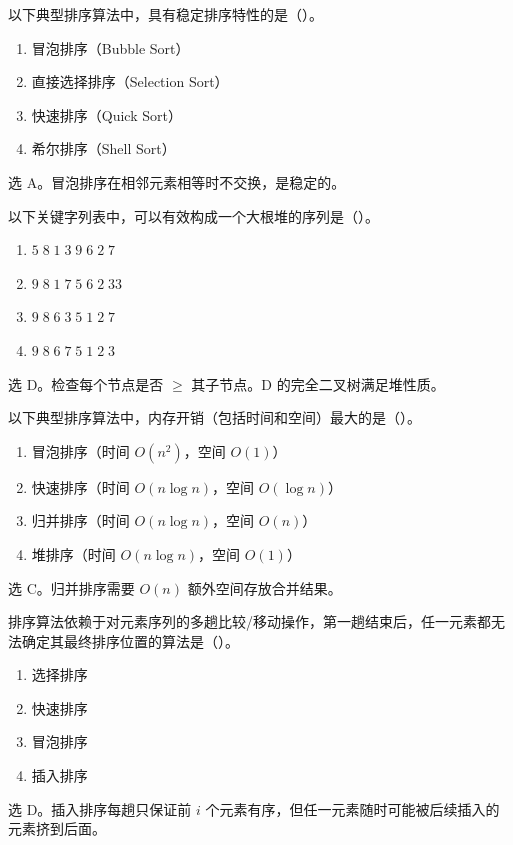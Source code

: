 \begin{question}
以下典型排序算法中，具有稳定排序特性的是（\quad）。
\begin{enumerate}
  \item 冒泡排序（Bubble Sort）
  \item 直接选择排序（Selection Sort）
  \item 快速排序（Quick Sort）
  \item 希尔排序（Shell Sort）
\end{enumerate}
\begin{solution}
选 A。冒泡排序在相邻元素相等时不交换，是稳定的。
\end{solution}
\end{question}

\begin{question}
以下关键字列表中，可以有效构成一个大根堆的序列是（\quad）。
\begin{enumerate}
  \item $5\;8\;1\;3\;9\;6\;2\;7$
  \item $9\;8\;1\;7\;5\;6\;2\;33$
  \item $9\;8\;6\;3\;5\;1\;2\;7$
  \item $9\;8\;6\;7\;5\;1\;2\;3$
\end{enumerate}
\begin{solution}
选 D。检查每个节点是否 $\ge$ 其子节点。D 的完全二叉树满足堆性质。
\end{solution}
\end{question}

\begin{question}
以下典型排序算法中，内存开销（包括时间和空间）最大的是（\quad）。
\begin{enumerate}
  \item 冒泡排序（时间 $O(n^2)$，空间 $O(1)$）
  \item 快速排序（时间 $O(n\log n)$，空间 $O(\log n)$）
  \item 归并排序（时间 $O(n\log n)$，空间 $O(n)$）
  \item 堆排序（时间 $O(n\log n)$，空间 $O(1)$）
\end{enumerate}
\begin{solution}
选 C。归并排序需要 $O(n)$ 额外空间存放合并结果。
\end{solution}
\end{question}

\begin{question}
排序算法依赖于对元素序列的多趟比较/移动操作，第一趟结束后，任一元素都无法确定其最终排序位置的算法是（\quad）。
\begin{enumerate}
  \item 选择排序
  \item 快速排序
  \item 冒泡排序
  \item 插入排序
\end{enumerate}
\begin{solution}
选 D。插入排序每趟只保证前 $i$ 个元素有序，但任一元素随时可能被后续插入的元素挤到后面。
\end{solution}
\end{question}

